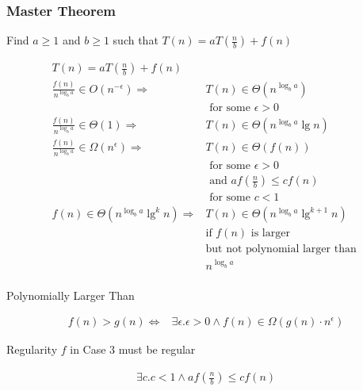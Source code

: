 \documentclass[10pt, a4paper,landscape]{article}
\begin{document}
\begin{multicols*}{4}
\subsubsection{Master Theorem}
\begin{compactitem}
    \item[Find] $a \geq 1$ and $b \geq 1$ such that $T(n) = a T\left(\frac n b\right) + f(n)$
\end{compactitem}
\begin{align*}
    T(n) = a T\left(\frac n b\right) + f(n) \\
    \frac{f(n)}{n^{\log_b a}} \in O(n^{-\epsilon})  \Rightarrow& T(n) \in \Theta(n^{\log_b a})\\ &\text{ for some } \epsilon > 0 \\
    \frac{f(n)}{n^{\log_b a}} \in \Theta(1) \Rightarrow& T(n) \in \Theta(n^{\log_b a} \lg n) \\
    \frac{f(n)}{n^{\log_b a}} \in \Omega(n^{\epsilon}) \Rightarrow& T(n) \in \Theta(f(n))\\ &\text{ for some } \epsilon > 0 \\&\text{ and } af(\frac{n}{b}) \leq cf(n)\\ &\text{ for some } c < 1 \\
    f(n) \in \Theta(n^{\log_b a} \lg^{k} n) \Rightarrow& T(n) \in \Theta(n^{\log_b a} \lg^{k + 1} n)\\ &\text{if } f(n) \text{ is larger}\\ &\text{but not polynomial larger than }\\ &n^{\log_b a}\\
\end{align*}

\begin{compactitem}
    \item[Polynomially Larger Than]
\end{compactitem}
\begin{align*}
    f(n) > g(n) \Leftrightarrow& \exists \epsilon. \epsilon > 0 \land f(n) \in \Omega(g(n) \cdot n^\epsilon)
\end{align*}

\begin{compactitem}
    \item[Regularity] $f$ in Case 3 must be regular
\end{compactitem}
\begin{align*}
    \exists c. c < 1 \land af\left(\frac n b\right) \leq cf(n)\\
\end{align*}

\end{multicols*}
\end{document}
